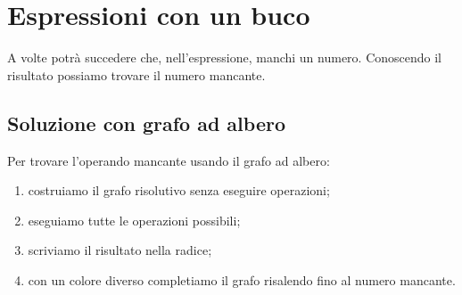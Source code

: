 \section{Espressioni con un buco}
\label{sec:nat_espressioni_buco}

A volte potrà succedere che, nell'espressione, manchi un numero.
Conoscendo il risultato possiamo trovare il numero mancante.

\subsection{Soluzione con grafo ad albero}


\begin{procedura}{}{}
 Per trovare l'operando mancante usando il grafo ad albero:
\begin{enumerate} [noitemsep]
 \item costruiamo il grafo risolutivo senza eseguire operazioni;
 \item eseguiamo tutte le operazioni possibili;
 \item scriviamo il risultato nella radice;
 \item con un colore diverso completiamo il grafo risalendo fino al numero 
  mancante.
\end{enumerate}
\end{procedura}

